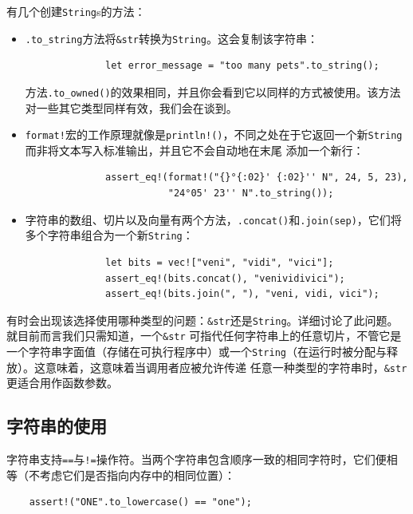 \medskip
有几个创建\texttt{String}s的方法：
\begin{itemize}
    \item \texttt{.to\_string}方法将\texttt{\&str}转换为\texttt{String}。这会复制该字符串：
          \begin{verbatim}
              let error_message = "too many pets".to_string();
          \end{verbatim}
    
          \smallskip
          方法\texttt{.to\_owned()}的效果相同，并且你会看到它以同样的方式被使用。该方法对一些其它类型同样有效，我们会在谈到。
    \item \texttt{format!}宏的工作原理就像是\texttt{println!()}，不同之处在于它返回一个新\texttt{String}而非将文本写入标准输出，并且它不会自动地在末尾
          添加一个新行：
          \begin{verbatim}
              assert_eq!(format!("{}°{:02}' {:02}'' N", 24, 5, 23),
                         "24°05' 23'' N".to_string());
          \end{verbatim}
  
          \smallskip
    \item 字符串的数组、切片以及向量有两个方法，\texttt{.concat()}和\texttt{.join(sep)}，它们将多个字符串组合为一个新\texttt{String}：
          \begin{verbatim}
              let bits = vec!["veni", "vidi", "vici"];
              assert_eq!(bits.concat(), "venividivici");
              assert_eq!(bits.join(", "), "veni, vidi, vici");
          \end{verbatim}

          \smallskip
\end{itemize}

\smallskip
有时会出现该选择使用哪种类型的问题：\texttt{\&str}还是\texttt{String}。详细讨论了此问题。就目前而言我们只需知道，一个\texttt{\&str}
可指代任何字符串上的任意切片，不管它是一个字符串字面值（存储在可执行程序中）或一个\texttt{String}（在运行时被分配与释放）。这意味着，这意味着当调用者应被允许传递
任意一种类型的字符串时，\texttt{\&str}更适合用作函数参数。

\medskip
\subsection{字符串的使用}
字符串支持\texttt{==}与\texttt{!=}操作符。当两个字符串包含顺序一致的相同字符时，它们便相等（不考虑它们是否指向内存中的相同位置）：
\begin{verbatim}
    assert!("ONE".to_lowercase() == "one");
\end{verbatim}

